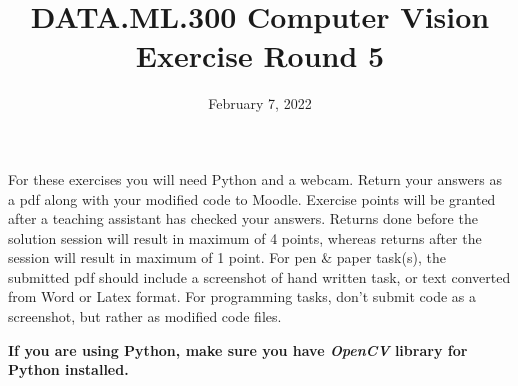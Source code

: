 \documentclass[12pt]{article} %
\title{DATA.ML.300 Computer Vision\\ Exercise Round 5}
\date{\vspace{-5mm} February 7, 2022}
\date{} %
\begin{document}
\maketitle


\noindent For these exercises you will need Python and a webcam.
Return your answers as a pdf along with your modified code to Moodle.
Exercise points will be granted after a teaching assistant has checked your answers.
Returns done before the solution session will result in maximum of 4 points,
whereas returns after the session will result in maximum of 1 point.
For pen \& paper task(s), the submitted pdf should include a screenshot of hand written task,
or text converted from Word or Latex format.
For programming tasks, don't submit code as a screenshot, but rather as modified code files.
\newline

\noindent \textbf{If you are using Python, make sure you have \textit{OpenCV} library for Python installed.} 
\newline
\end{document}
